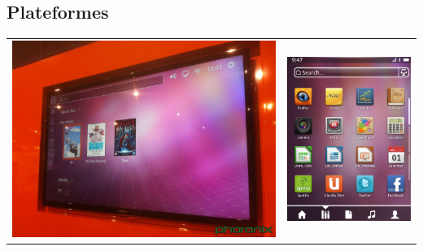 \documentclass{beamer}
\begin{document}
\subsection*{Plateformes}
\begin{frame}
\begin{tabular}{c c}
\begin{minipage}{0.55\linewidth}
\includegraphics[width=\linewidth]{images/tv}
\end{minipage}
&
\begin{minipage}{0.4\linewidth}
\includegraphics[width=\linewidth]{images/phone}
\end{minipage}
\end{tabular}
\end{frame}
\end{document}
